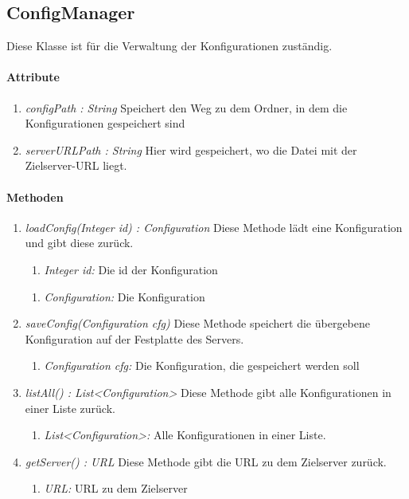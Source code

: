 
\subsection{ConfigManager}
Diese Klasse ist für die Verwaltung der Konfigurationen zuständig.
\paragraph{Attribute}
\begin{enumerate}[-]
	\item \textit{configPath : String} Speichert den Weg zu dem Ordner, in dem die Konfigurationen gespeichert sind
	
	\item \textit{serverURLPath : String} Hier wird gespeichert, wo die Datei mit der Zielserver-URL liegt.		
\end{enumerate}

\paragraph{Methoden}
	
	\begin{enumerate}[+]
	\item \textit{loadConfig(Integer id) : Configuration} Diese Methode lädt eine Konfiguration und gibt diese zurück.
		\begin{enumerate}[$\bullet$]
			\item \textit{Integer id:} Die id der Konfiguration
		\end{enumerate}
		\vspace{-0.2cm}
		\begin{enumerate}[$\circ$]
			\item \textit{Configuration:} Die Konfiguration
		\end{enumerate}
	
	\item \textit{saveConfig(Configuration cfg)} Diese Methode speichert die übergebene Konfiguration auf der Festplatte des Servers.
	
	\begin{enumerate}[$\bullet$]
		\item \textit{Configuration cfg:} Die Konfiguration, die gespeichert werden soll
	\end{enumerate}
	
	\item \textit{listAll() : List<Configuration>} Diese Methode gibt alle Konfigurationen in einer Liste zurück.
	
	\begin{enumerate}[$\circ$]
		\item \textit{List<Configuration>:} Alle Konfigurationen in einer Liste.
	\end{enumerate}
	
	\item \textit{getServer() : URL} Diese Methode gibt die URL zu dem Zielserver zurück.
	
	\begin{enumerate}[$\circ$]
		\item \textit{URL:} URL zu dem Zielserver
	\end{enumerate}
\end{enumerate}